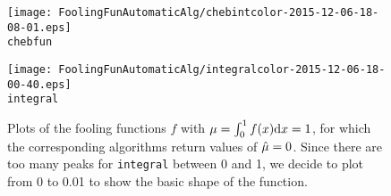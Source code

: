\documentclass{iitthesis}
\theoremstyle{definition}
\begin{document}



\begin{figure}[htbp]
\centering
\begin{minipage}{7cm}\centering 
\texttt{[image: FoolingFunAutomaticAlg/chebintcolor-2015-12-06-18-08-01.eps]} \\ {\tt chebfun}  \end{minipage}%
\begin{minipage}{7cm}\centering 
\texttt{[image: FoolingFunAutomaticAlg/integralcolor-2015-12-06-18-00-40.eps]} \\{\tt integral}
\end{minipage}
\caption{Plots of the fooling functions $f$ with $\mu = \int_0^1f(x){\rm d} x=1$, for which the corresponding algorithms return values of $\hat{\mu}=0$. Since there are too many peaks for {\tt integral} between 0 and 1, we decide to plot from 0 to 0.01 to show the basic shape of the function.}\label{fig:foolingfun}
 \end{figure}
 
\end{document}

